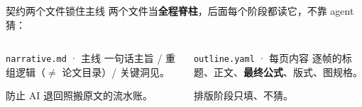 \begin{frame}{契约}{两个文件锁住主线}
  两个文件当\textbf{全程脊柱}，后面每个阶段都读它，不靠 agent 猜：

  \medskip
  \begin{columns}[T,onlytextwidth]
      \begin{block}{\texttt{narrative.md} · 主线}
        一句话主旨 / 重组逻辑（$\neq$ 论文目录）/ 关键洞见。

        \medskip
        \alert{防止 AI 退回照搬原文的流水账。}
      \end{block}
      \begin{block}{\texttt{outline.yaml} · 每页内容}
        逐帧的标题、正文、\textbf{最终公式}、版式、图规格。

        \medskip
        排版阶段只填、不猜。
      \end{block}
  \end{columns}

\end{frame}
